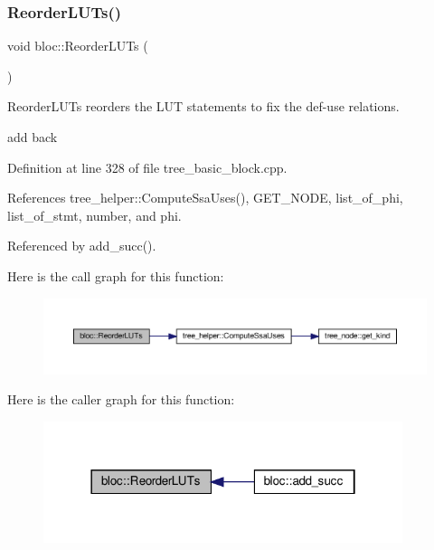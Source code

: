 \subsubsection{\texorpdfstring{Reorder\+L\+U\+Ts()}{ReorderLUTs()}}
{\footnotesize\ttfamily void bloc\+::\+Reorder\+L\+U\+Ts (\begin{DoxyParamCaption}{ }\end{DoxyParamCaption})}



Reorder\+L\+U\+Ts reorders the L\+UT statements to fix the def-\/use relations. 

add back 

Definition at line 328 of file tree\+\_\+basic\+\_\+block.\+cpp.



References tree\+\_\+helper\+::\+Compute\+Ssa\+Uses(), G\+E\+T\+\_\+\+N\+O\+DE, list\+\_\+of\+\_\+phi, list\+\_\+of\+\_\+stmt, number, and phi.



Referenced by add\+\_\+succ().

Here is the call graph for this function\+:
\nopagebreak
\begin{figure}[H]
\begin{center}
\leavevmode
\includegraphics[width=350pt]{d6/df6/structbloc_a3f4b8d5c91289b27e92552a962b2567a_cgraph}
\end{center}
\end{figure}
Here is the caller graph for this function\+:
\nopagebreak
\begin{figure}[H]
\begin{center}
\leavevmode
\includegraphics[width=298pt]{d6/df6/structbloc_a3f4b8d5c91289b27e92552a962b2567a_icgraph}
\end{center}
\end{figure}
\mbox{\label{structbloc_abe24c6557b28cc9ece43884022766ea8}} 
